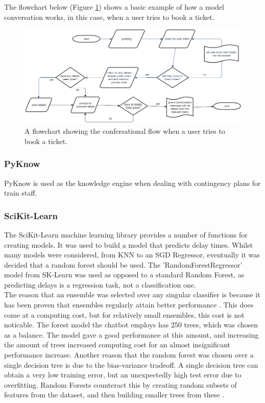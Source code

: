 \documentclass[12pt,a4paper]{article}
\begin{document}
    The flowchart below (Figure \ref{fig:overall_flowchart}) shows a basic example of how a model conversation works, in this case, when a user tries to book a ticket.
    
    \begin{figure}[H]
        \centering
        \includegraphics[scale=0.4]{Images/flowchart_overall.png}
        \caption{A flowchart showing the confersational flow when a user tries to book a ticket.}
        \label{fig:overall_flowchart}
    \end{figure}
    
    \subsubsection{PyKnow}
    PyKnow is used as the knowledge engine when dealing with contingency plans for train staff. 
    
    \subsubsection{SciKit-Learn}
    The SciKit-Learn machine learning library provides a number of functions for creating models. It was used to build a model that predicts delay times. Whilst many models were considered, from KNN to an SGD Regressor, eventually it was decided that a random forest should be used. The 'RandomForestRegressor' model from SK-Learn was used as opposed to a standard Random Forest, as predicting delays is a regression task, not a classification one. \\
    
    The reason that an ensemble was selected over any singular classifier is because it has been proven that ensembles regularly attain better performance \citep{Dietterich2000}. This does come at a computing cost, but for relatively small ensembles, this cost is not noticable. The forest model the chatbot employs has 250 trees, which was chosen as a balance. The model gave a good performance at this amount, and increasing the amount of trees increased computing cost for an almost insignificant performance increase. Another reason that the random forest was chosen over a single decision tree is due to the bias-variance tradeoff. A single decision tree can obtain a very low training error, but an unexpectedly high test error due to overfitting. Random Forests counteract this by creating random subsets of features from the dataset, and then building smaller trees from these \citep{Breiman2001}. \\
    
\end{document}
